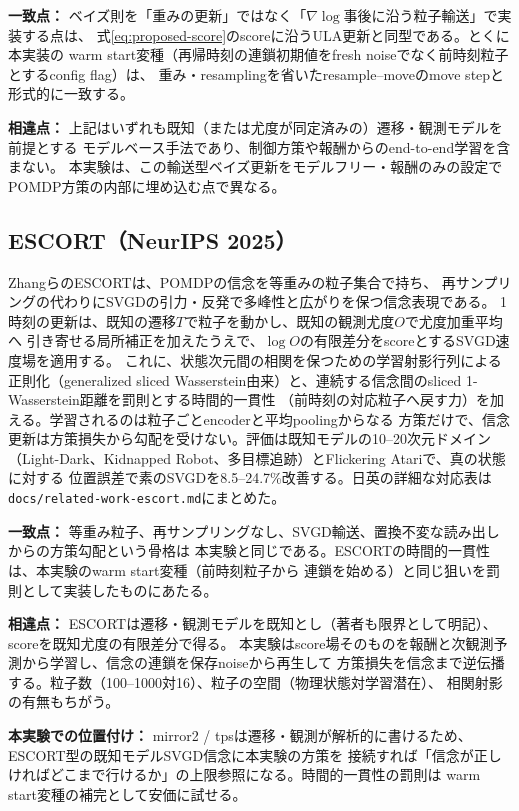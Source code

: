\documentclass[a4paper,11pt]{article}
\newcommand{\matchpoint}{\par\noindent\textbf{一致点：}}
\newcommand{\difference}{\par\noindent\textbf{相違点：}}
\newcommand{\recommendation}{\par\noindent\textbf{本実験での位置付け：}}
\begin{document}
\matchpoint
ベイズ則を「重みの更新」ではなく「$\nabla\log$事後に沿う粒子輸送」で実装する点は、
式\eqref{eq:proposed-score}のscoreに沿うULA更新と同型である。とくに本実装の
warm start変種（再帰時刻の連鎖初期値をfresh noiseでなく前時刻粒子とするconfig flag）は、
重み・resamplingを省いたresample--moveのmove stepと形式的に一致する。

\difference
上記はいずれも既知（または尤度が同定済みの）遷移・観測モデルを前提とする
モデルベース手法であり、制御方策や報酬からのend-to-end学習を含まない。
本実験は、この輸送型ベイズ更新をモデルフリー・報酬のみの設定で
POMDP方策の内部に埋め込む点で異なる。

\subsection{ESCORT（NeurIPS 2025）}

Zhangら\cite{zhang2025escort}のESCORTは、POMDPの信念を等重みの粒子集合で持ち、
再サンプリングの代わりにSVGDの引力・反発で多峰性と広がりを保つ信念表現である。
1時刻の更新は、既知の遷移$T$で粒子を動かし、既知の観測尤度$O$で尤度加重平均へ
引き寄せる局所補正を加えたうえで、$\log O$の有限差分をscoreとするSVGD速度場を適用する。
これに、状態次元間の相関を保つための学習射影行列による正則化（generalized sliced
Wasserstein由来）と、連続する信念間のsliced 1-Wasserstein距離を罰則とする時間的一貫性
（前時刻の対応粒子へ戻す力）を加える。学習されるのは粒子ごとencoderと平均poolingからなる
方策だけで、信念更新は方策損失から勾配を受けない。評価は既知モデルの10--20次元ドメイン
（Light-Dark、Kidnapped Robot、多目標追跡）とFlickering Atariで、真の状態に対する
位置誤差で素のSVGDを8.5--24.7\%改善する。日英の詳細な対応表は
\texttt{docs/related-work-escort.md}にまとめた。

\matchpoint
等重み粒子、再サンプリングなし、SVGD輸送、置換不変な読み出しからの方策勾配という骨格は
本実験と同じである。ESCORTの時間的一貫性は、本実験のwarm start変種（前時刻粒子から
連鎖を始める）と同じ狙いを罰則として実装したものにあたる。

\difference
ESCORTは遷移・観測モデルを既知とし（著者も限界として明記）、scoreを既知尤度の有限差分で得る。
本実験はscore場そのものを報酬と次観測予測から学習し、信念の連鎖を保存noiseから再生して
方策損失を信念まで逆伝播する。粒子数（100--1000対16）、粒子の空間（物理状態対学習潜在）、
相関射影の有無もちがう。

\recommendation
mirror2 / tpsは遷移・観測が解析的に書けるため、ESCORT型の既知モデルSVGD信念に本実験の方策を
接続すれば「信念が正しければどこまで行けるか」の上限参照になる。時間的一貫性の罰則は
warm start変種の補完として安価に試せる。
\end{document}
